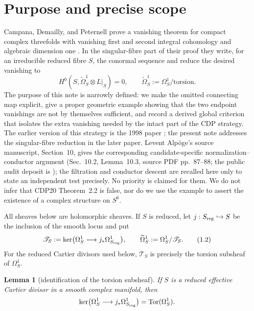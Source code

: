 \documentclass[11pt]{amsart}
\theoremstyle{plain}
\newtheorem{lemma}[theorem]{Lemma}
\theoremstyle{definition}
\theoremstyle{remark}
\begin{document}
\maketitle

\section{Purpose and precise scope}

Campana, Demailly, and Peternell prove a vanishing theorem for compact
complex threefolds with vanishing first and second integral cohomology and
algebraic dimension one \cite{CDP2020}.  In the singular-fibre part of their
proof they write, for an irreducible reduced fibre $S$, the conormal sequence
and reduce the desired vanishing to
\[
 H^0(S,\widetilde\Omega^1_S\otimes L|_S)=0,
 \qquad
 \widetilde\Omega^1_S:=\Omega^1_S/\text{torsion}.
 \tag{1.1}
\]
The purpose of this note is narrowly defined: we make the omitted connecting
map explicit, give a proper geometric example showing that the two endpoint
vanishings are not by themselves sufficient, and record a derived global
criterion that isolates the extra vanishing needed by the intact part of the
CDP strategy.  The earlier version of this strategy is the 1998 paper
\cite{CDP1998}; the present note addresses the singular-fibre reduction in the
  later paper.  Levent Alp{\"o}ge's source manuscript, Section~10, gives the corresponding
  candidate-specific normalization--conductor argument (Sec.~10.2,
  Lemma~10.3, source PDF pp.~87--88; the public audit deposit is
  \cite{S6AuditArchive}); the filtration and conductor descent are recalled
  here only to state an independent test precisely.  No priority is claimed
  for them.  We do not infer
that CDP20 Theorem~2.2 is
false, nor do we use the example to assert the existence of a complex
structure on $S^6$.

All sheaves below are holomorphic sheaves.  If $S$ is reduced, let
$j:S_{\rm reg}\hookrightarrow S$ be the inclusion of the smooth locus and
put
\[
 \mathscr T_S:=\ker\bigl(\Omega^1_S\longrightarrow
 j_*\Omega^1_{S_{\rm reg}}\bigr),
 \qquad
 \widetilde\Omega^1_S:=\Omega^1_S/\mathscr T_S.
 \tag{1.2}
\]
For the reduced Cartier divisors used below, $\mathscr T_S$ is precisely the
torsion subsheaf of $\Omega^1_S$.

\begin{lemma}[identification of the torsion subsheaf]
\label{lem:torsion-identification}
If $S$ is a reduced effective Cartier divisor in a smooth complex manifold,
then
\[
\ker\bigl(\Omega^1_S\longrightarrow j_*\Omega^1_{S_{\rm reg}}\bigr)
  =\operatorname{Tor}(\Omega^1_S).
\]
\end{lemma}
\end{document}
